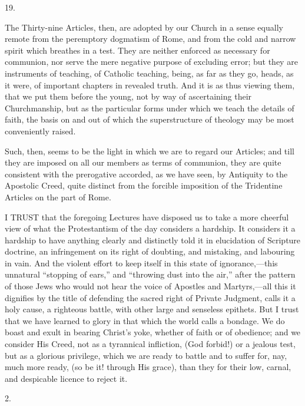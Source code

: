 19.

The Thirty-nine Articles, then, are adopted by our Church in a
sense equally remote from the peremptory dogmatism of Rome, and from
the cold and narrow spirit which breathes in a test. They are neither
enforced as necessary for communion, nor serve the mere negative
purpose of excluding error; but they are instruments of teaching, of
Catholic teaching, being, as far as they go, heads, as it were, of
important chapters in revealed truth. And it is as thus viewing them,
that we put them before the young, not by way of ascertaining their
Churchmanship, but as the particular forms under which we teach the
details of faith, the basis on and out of which the superstructure of
theology may be most conveniently raised.

Such, then, seems to be the light in which we are to regard our
Articles; and till they are imposed on all our members as terms of
communion, they are quite consistent with the prerogative accorded, as
we have seen, by Antiquity to the Apostolic Creed, quite distinct from
the forcible imposition of the Tridentine Articles on the part of
Rome.


I TRUST that the foregoing Lectures have disposed us to take
a more cheerful view of what the Protestantism of the day considers a
hardship. It considers it a hardship to have anything clearly and
distinctly told it in elucidation of Scripture doctrine, an
infringement on its right of doubting, and mistaking, and labouring in
vain. And the violent effort to keep itself in this state of
ignorance,—this unnatural ``stopping of ears,'' and
``throwing dust into the air,'' after the pattern of those
Jews who would not hear the voice of Apostles and Martyrs,—all this
it dignifies by the title of defending the sacred right of Private
Judgment, calls it a holy cause, a righteous battle, with other large
and senseless epithets. But I trust that we have learned to glory in
that which the world calls a bondage. We do boast and exult in bearing
Christ's yoke, whether of faith or of obedience; and we consider His
Creed, not as a tyrannical infliction, (God forbid!) or a jealous
test, but as a glorious privilege, which we are ready to battle and to
suffer for, nay, much more ready, (so be it! through His grace), than
they for their low, carnal, and despicable licence to reject it.

2.

